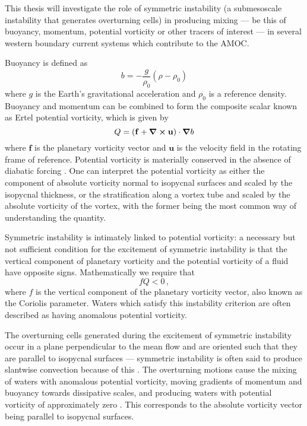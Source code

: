 This thesis will investigate the role of symmetric instability (a submesoscale instability that generates overturning cells) in producing mixing --- be this of buoyancy, momentum, potential vorticity or other tracers of interest --- in several western boundary current systems which contribute to the AMOC.

Buoyancy is defined as
\begin{equation}
    b = -\frac{g}{\rho_{0}}(\rho - \rho_{0})
\end{equation}
where $g$ is the Earth's gravitational acceleration and $\rho_{0}$ is a reference density. Buoyancy and momentum can be combined to form the composite scalar known as Ertel potential vorticity, which is given by
\begin{equation}
    \label{eq:EPV}
    Q = (\mathbf{f} + \curl{\mathbf{u}}) \cdot \grad{b}
\end{equation}
where $\mathbf{f}$ is the planetary vorticity vector and $\mathbf{u}$ is the velocity field in the rotating frame of reference. Potential vorticity is materially conserved in the absence of diabatic forcing \citep{Ertel1942}. One can interpret the potential vorticity as either the component of absolute vorticity normal to isopycnal surfaces and scaled by the isopycnal thickness, or the stratification along a vortex tube and scaled by the absolute vorticity of the vortex, with the former being the most common way of understanding the quantity.

Symmetric instability is intimately linked to potential vorticity: a necessary but not sufficient condition for the excitement of symmetric instability is that the vertical component of planetary vorticity and the potential vorticity of a fluid have opposite signs. Mathematically we require that
\begin{equation}
    \label{eq:PVSI1}
    f Q < 0 \, ,
\end{equation}
where $f$ is the vertical component of the planetary vorticity vector, also known as the Coriolis parameter\footnotemark. Waters which satisfy this instability criterion are often described as having anomalous potential vorticity.

The overturning cells generated during the excitement of symmetric instability occur in a plane perpendicular to the mean flow and are oriented such that they are parallel to isopycnal surfaces --- symmetric instability is often said to produce slantwise convection because of this \citep[e.g.][]{emanuelSlantwiseConvection1994}. The overturning motions cause the mixing of waters with anomalous potential vorticity, moving gradients of momentum and buoyancy towards dissipative scales, and producing waters with potential vorticity of approximately zero \citep{Taylor2009}. This corresponds to the absolute vorticity vector being parallel to isopycnal surfaces.

